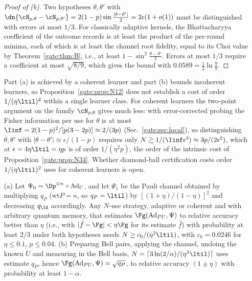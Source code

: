 \begin{proof}[Proof of (b)]
Two hypotheses $\theta,\theta'$ with $\dn{\cN_{p,\theta}-\cN_{p,\theta'}}=2(1-p)\sin\frac{|\theta-\theta'|}{2}=2\epsilon(1+o(1))$ must be distinguished with errors at most $1/3$. For classically adaptive kernels, the Bhattacharyya coefficient of the outcome records is at least the product of the per-round minima, each of which is at least the channel root fidelity, equal to its Choi value by Theorem~\ref{gate:thm:B}, i.e., at least $1-\sin^2\frac{\theta-\theta'}{2}$. Errors at most $1/3$ require a coefficient at most $\sqrt{8/9}$, which gives the bound with $0.0589=\frac12\ln\frac98$.
\end{proof}

\begin{remark}\label{gate:rem:coherent}
Part (a) is achieved by a coherent learner and part (b) bounds incoherent learners, so Proposition~\ref{gate:prop:N12} does not establish a cost of order $1/(\eta\ltil)^2$ within a single learner class. For coherent learners the two-point argument on the family $\cN_{p,\theta}$ gives much less: with error-corrected probing the Fisher information per use for $\theta$ is at most $\Iinf=2(1-p)^2/[p(3-2p)]\approx2/(3p)$ (Sec.~\ref{gate:sec:local}), so distinguishing $\theta,\theta'$ with $|\theta-\theta'|\approx\epsilon/(1-p)$ requires only $N\gtrsim1/(\Iinf\epsilon^2)\approx3p/(2\epsilon^2)$, which at $\epsilon=4\eta\ltil=\eta p$ is of order $1/(\eta^2p)$, the order of the intrinsic cost of Proposition~\ref{gate:prop:N34}. Whether diamond-ball certification costs order $1/(\eta\ltil)^2$ uses for coherent learners is open.
\end{remark}

\begin{proposition}\label{gate:prop:N34}
(a) Let $\Psi_0=\Dp^{\otimes n}\circ\mathrm{Ad}_U$, and let $\Psi_1$ be the Pauli channel obtained by multiplying $q_P$ ($\mathrm{wt}P=n$, so $q_P=\ltil$) by $[(1+\eta)/(1-\eta)]^2$ and decreasing $q_\Id$ accordingly. Any $N$-use strategy, adaptive or coherent and with arbitrary quantum memory, that estimates $\Fg(\mathrm{Ad}_{PU},\Psi)$ to relative accuracy better than $\eta$ (i.e., with $|\hat f-\Fg|<\eta\Fg$ for its estimate $\hat f$) with probability at least $2/3$ under both hypotheses needs $N\ge c_0/(\eta^2\ltil)$, with $c_0=0.0246$ for $\eta\le0.1$, $p\le0.04$. (b) Preparing Bell pairs, applying the channel, undoing the known $U$ and measuring in the Bell basis, $N=\lceil3\ln(2/\alpha)/(\eta^2\ltil)\rceil$ uses estimate $q_P$, hence $\Fg(\mathrm{Ad}_{PU},\Psi)=\sqrt{q_P}$, to relative accuracy $(1\pm\eta)$ with probability at least $1-\alpha$.
\end{proposition}

